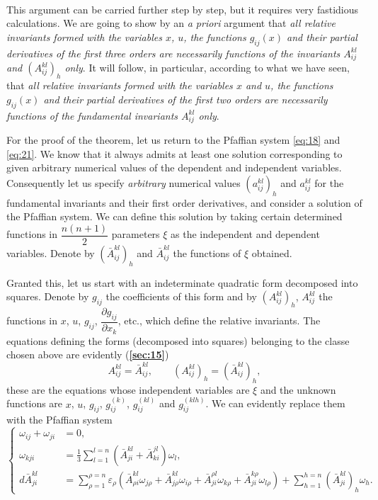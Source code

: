 \documentclass[leqno,12pt]{article}
\makeatletter
\let\old@epsilon\epsilon
\let\old@varepsilon\varepsilon
\let\epsilon\old@varepsilon
\let\varepsilon\old@epsilon
\newcommand{\pd}{\partial}
\theoremstyle{shape1}
\theoremstyle{shape0}
\theoremstyle{shape2}
\theoremstyle{definition}
\makeatother
\begin{document}
\paragraph{}
\label{sec:22}
This argument can be carried further step by step, but it requires very fastidious calculations. We are going to show by an \emph{a priori} argument that \emph{all relative invariants formed with the variables $x$, $u$, the functions $g_{ij}(x)$ and their partial derivatives of the first three orders are necessarily functions of the invariants $A^{kl}_{ij}$ and $(A^{kl}_{ij})_{h}$ only}. It will follow, in particular, according to what we have seen, that \emph{all relative invariants formed with the variables $x$ and $u$, the functions $g_{ij}(x)$ and their partial derivatives of the first two orders are necessarily functions of the fundamental invariants $A^{kl}_{ij}$ only}.

For the proof of the theorem, let us return to the Pfaffian system \eqref{eq:18} and \eqref{eq:21}. We know that it always admits at least one solution corresponding to given arbitrary numerical values of the dependent and independent variables. Consequently let us specify \emph{arbitrary} numerical values $(a^{kl}_{ij})_{h}$ and $a^{kl}_{ij}$ for the fundamental invariants and their first order derivatives, and consider a solution of the Pfaffian system. We can define this solution by taking certain determined functions in $\dfrac{n(n+1)}{2}$ parameters $\xi$ as the independent and dependent variables. Denote by $(\bar A^{kl}_{ij})_{h}$ and $\bar A^{kl}_{ij}$ the functions of $\xi$ obtained.

Granted this, let us start with an indeterminate quadratic form decomposed into squares. Denote by $g_{ij}$ the coefficients of this form and by $(A^{kl}_{ij})_{h}$, $A^{kl}_{ij}$ the functions in $x$, $u$, $g_{ij}$, $\dfrac{\pd g_{ij}}{\pd x_{k}}$, etc., which define the relative invariants. The equations defining the forms (decomposed into squares) belonging to the classe chosen above are evidently (\textsection\textbf{\ref{sec:15}})
\begin{equation}
  \label{eq:40}
  A^{kl}_{ij}=\bar A^{kl}_{ij},\qquad (A^{kl}_{ij})_{h}=(\bar A^{kl}_{ij})_{h},
\end{equation}
these are the equations whose independent variables are $\xi$ and the unknown functions are $x$, $u$, $g_{ij}$, $g_{ij}^{(k)}$, $g_{ij}^{(kl)}$ and $g_{ij}^{(klh)}$. We can evidently replace them with the Pfaffian system
\begin{equation}
  \label{eq:41}
  \left\{
    \begin{aligned}
      \omega_{ij}+\omega_{ji}&=0,\\
      \omega_{kji}&=\frac{1}{3}\sum_{l=1}^{l=n}(\bar A_{ji}^{kl}+\bar A_{ki}^{jl})\omega_{l},\\
      d\bar A^{kl}_{ji}&=\sum_{\rho=1}^{\rho=n}\epsilon_{\rho}(\bar A^{kl}_{\rho i}\omega_{j\rho}+\bar A^{kl}_{j\rho}\omega_{i\rho}+\bar A^{\rho l}_{ji}\omega_{k\rho}+\bar A^{k\rho}_{ji}\omega_{l\rho})+\sum_{h=1}^{h=n}(\bar A^{kl}_{ji})_{h}\omega_{h}.
    \end{aligned}
  \right.
\end{equation}
\end{document}
